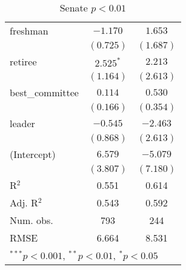\documentclass[12pt]{article}
\begin{document}
\begin{table}
\begin{center}
\begin{tabular}{l c c }
			freshman               & $-1.170$       & $1.653$        \\
			& $(0.725)$      & $(1.687)$      \\
			retiree                & $2.525^{*}$    & $2.213$        \\
			& $(1.164)$      & $(2.613)$      \\
			best\_committee        & $0.114$        & $0.530$        \\
			& $(0.166)$      & $(0.354)$      \\
			leader                 & $-0.545$       & $-2.463$       \\
			& $(0.868)$      & $(2.613)$      \\
			(Intercept)            & $6.579$        & $-5.079$       \\
			& $(3.807)$      & $(7.180)$      \\
			\hline
			R$^2$                  & 0.551          & 0.614          \\
			Adj. R$^2$             & 0.543          & 0.592          \\
			Num. obs.              & 793            & 244            \\
			RMSE                   & 6.664          & 8.531          \\
			\hline
			\multicolumn{3}{l}{\scriptsize{$^{***}p<0.001$, $^{**}p<0.01$, $^*p<0.05$}}
		\end{tabular}
		\caption{Senate $ p < 0.01 $}
		\label{table:coefficients}
	\end{center}
\end{table}
\end{document}
